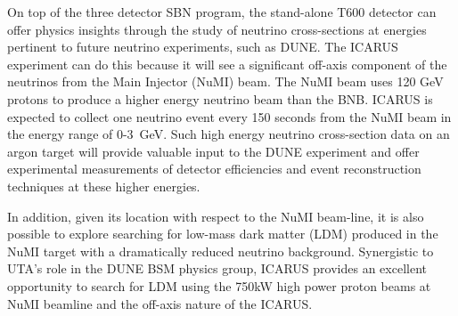 On top of the three detector SBN program, the stand-alone T600 detector can offer physics insights through the study of neutrino cross-sections at energies pertinent to future neutrino experiments, such as DUNE. The ICARUS experiment can do this because it will see a significant off-axis component of the neutrinos from the Main Injector (NuMI) beam. The NuMI beam uses 120 GeV protons to produce a higher energy neutrino beam than the BNB. ICARUS is expected to collect one neutrino event every 150 seconds from the NuMI beam in the energy range of 0-3~GeV.  Such high energy neutrino cross-section data on an argon target will provide valuable input to the DUNE experiment and offer experimental measurements of detector efficiencies and event reconstruction techniques at these higher energies.

In addition, given its location with respect to the NuMI beam-line, it is also possible to explore searching for low-mass dark matter (LDM) produced in the NuMI target with a dramatically reduced neutrino background.  Synergistic to UTA's role in the DUNE BSM physics group, ICARUS provides an excellent opportunity to search for LDM using the 750kW high power proton beams at NuMI beamline and the off-axis nature of the ICARUS.  


